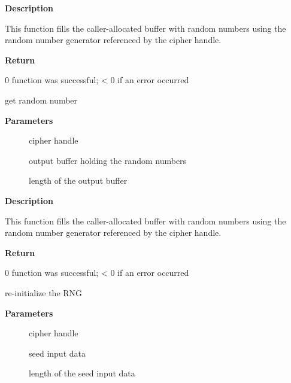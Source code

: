 \documentclass[a4paper,8pt,english]{sphinxmanual}
\begin{document}
\textbf{Description}

This function fills the caller-allocated buffer with random
numbers using the random number generator referenced by the
cipher handle.

\textbf{Return}

0 function was successful; \textless{} 0 if an error occurred

\begin{fulllineitems}
\label{crypto/api-rng:c.crypto_rng_get_bytes}
get random number

\end{fulllineitems}


\textbf{Parameters}
\begin{description}
\item[{}] \leavevmode
cipher handle

\item[{}] \leavevmode
output buffer holding the random numbers

\item[{}] \leavevmode
length of the output buffer

\end{description}

\textbf{Description}

This function fills the caller-allocated buffer with random numbers using the
random number generator referenced by the cipher handle.

\textbf{Return}

0 function was successful; \textless{} 0 if an error occurred

\begin{fulllineitems}
\label{crypto/api-rng:c.crypto_rng_reset}
re-initialize the RNG

\end{fulllineitems}


\textbf{Parameters}
\begin{description}
\item[{}] \leavevmode
cipher handle

\item[{}] \leavevmode
seed input data

\item[{}] \leavevmode
length of the seed input data

\end{description}
\end{document}
